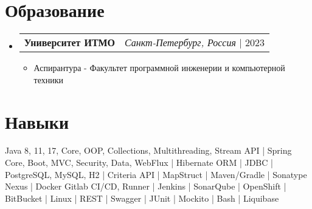 \documentclass[letterpaper,11pt]{article}
\makeatletter
\newcommand{\resumeItem}[1]{
  \item\small{
    {#1 \vspace{-2pt}}
  }
}
\newcommand{\resumeProjectHeading}[2]{
    \item
    \begin{tabular*}{0.97\textwidth}{l@{\extracolsep{\fill}}r}
      \small#1 & #2 \\
    \end{tabular*}\vspace{-7pt}
}
\newcommand{\resumeSubHeadingListStart}{\begin{itemize}[leftmargin=0.15in, label={}]}
\newcommand{\resumeSubHeadingListEnd}{\end{itemize}}
\newcommand{\resumeItemListStart}{\begin{itemize}}
\newcommand{\resumeItemListEnd}{\end{itemize}\vspace{-5pt}}
\makeatother
\begin{document}
\section{Образование}
  \resumeSubHeadingListStart
  
    \resumeProjectHeading
      {\textbf{Университет ИТМО}}
      {\footnotesize\emph{Санкт-Петербург, Россия} $|$ {2023}}
     \resumeItemListStart
      \resumeItem{{Аспирантура - Факультет программной инженерии и компьютерной техники}}{}
\resumeItemListEnd

  \resumeSubHeadingListEnd

\section{Навыки}
    \small{
        Java 8, 11, 17, Core, OOP, Collections, Multithreading, Stream API | Spring Core, Boot, MVC, Security, Data, WebFlux | Hibernate ORM | JDBC | PostgreSQL, MySQL, H2 | Criteria API | MapStruct | Maven/Gradle | Sonatype Nexus | Docker Gitlab CI/CD, Runner | Jenkins | SonarQube | OpenShift | BitBucket | Linux | REST | Swagger | JUnit | Mockito | Bash | Liquibase 
    }


    
\end{document}
